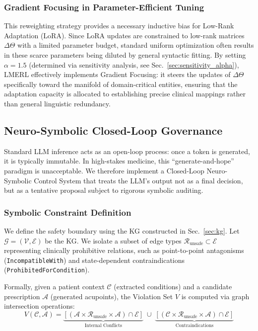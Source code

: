 \documentclass[preprint,5p,times,twocolumn,fleqn]{elsarticle}
\begin{document}
\subsubsection{Gradient Focusing in Parameter-Efficient Tuning}
This reweighting strategy provides a necessary inductive bias for Low-Rank Adaptation (LoRA). Since LoRA updates are constrained to low-rank matrices $\Delta\Theta$ with a limited parameter budget, standard uniform optimization often results in these scarce parameters being diluted by general syntactic fitting. 
By setting $\alpha=1.5$ (determined via sensitivity analysis, see Sec.~\ref{sec:sensitivity_alpha}), LMERL effectively implements Gradient Focusing: it steers the updates of $\Delta\Theta$ specifically toward the manifold of domain-critical entities, ensuring that the adaptation capacity is allocated to establishing precise clinical mappings rather than general linguistic redundancy.

\subsection{Neuro-Symbolic Closed-Loop Governance}
\label{sec:kg_infer}

Standard LLM inference acts as an open-loop process: once a token is generated, it is typically immutable. In high-stakes medicine, this ``generate-and-hope'' paradigm is unacceptable. We therefore implement a Closed-Loop Neuro-Symbolic Control System that treats the LLM's output not as a final decision, but as a tentative proposal subject to rigorous symbolic auditing.

\subsubsection{Symbolic Constraint Definition}
We define the safety boundary using the KG constructed in Sec.~\ref{sec:kg}. Let $\mathcal{G}=(\mathcal{V}, \mathcal{E})$ be the KG. We isolate a subset of edge types $\mathcal{R}_{\text{unsafe}} \subset \mathcal{E}$ representing clinically prohibitive relations, such as point-to-point antagonisms (\texttt{IncompatibleWith}) and state-dependent contraindications (\texttt{ProhibitedForCondition}).

Formally, given a patient context $\mathcal{C}$ (extracted conditions) and a candidate prescription $\mathcal{A}$ (generated acupoints), the Violation Set $V$ is computed via graph intersection operations:
\begin{equation}
\label{eq:violation_set}
V(\mathcal{C}, \mathcal{A}) = \underbrace{\left[ (\mathcal{A} \times \mathcal{R}_{\text{unsafe}} \times \mathcal{A}) \cap \mathcal{E} \right]}_{\text{Internal Conflicts}} \;\cup\; \underbrace{\left[ (\mathcal{C} \times \mathcal{R}_{\text{unsafe}} \times \mathcal{A}) \cap \mathcal{E} \right]}_{\text{Contraindications}}
\end{equation}
\end{document}

